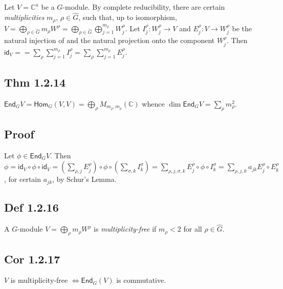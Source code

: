 \documentclass[a4paper]{amsart}
\newcommand{\C}{\mathbb{C}}
\newcommand{\Hom}{\mathsf{Hom}}
\newcommand{\End}{\mathsf{End}}
\newcommand{\id}{\mathsf{id}}
\begin{document}
\subsection{}
Let $V = \C^n$ be a $G$-module.  By complete reducibility, there are
certain \emph{multiplicities} $m_{\rho}$, $\rho \in \hat{G}$, such that, up
to isomorphism, $V = \bigoplus_{\rho \in \hat{G}} m_{\rho} W^{\rho} =
\bigoplus_{\rho \in \hat{G}} \bigoplus_{j = 1}^{m_{\rho}} W^{\rho}_j$.  Let
$I^{\rho}_j \colon W^{\rho}_j \to V$ and $E^{\rho}_j \colon V \to
W^{\rho}_j$ be the natural injection of and the natural projection
onto the component $W^{\rho}_j$.  Then $\id_V = 
= \sum_{\rho} \sum_{j=1}^{m_{\rho}} I^{\rho}_j =
\sum_{\rho} \sum_{j=1}^{m_\rho} E^{\rho}_j$.



\subsection{Thm 1.2.14}
$\End_G V = \Hom_G(V, V) = \bigoplus_{\rho} M_{m_{\rho}, m_{\rho}}(\C)$
whence $\dim \End_G V = \sum_{\rho} m_{\rho}^2$.

\subsection{Proof}
 Let $\phi \in \End_G V$.  Then $\phi
 = \id_V \circ \phi \circ \id_V
 = (\sum_{\rho,j} E^{\rho}_j) \circ \phi \circ (\sum_{\sigma,k} I^{\sigma}_k)
 = \sum_{\rho,j,\sigma,k} E^{\rho}_j \circ \phi \circ I^{\sigma}_k
 = \sum_{\rho,j,k} a_{jk} E^{\rho}_j \circ E^{\rho}_k$, for certain $a_{jk}$, by Schur's Lemma.


\subsection{Def 1.2.16}
A $G$-module $V = \bigoplus_{\rho} m_{\rho} W^{\rho}$ is
\emph{multiplicity-free} if $m_{\rho} < 2$ for all $\rho \in \hat{G}$.

\subsection{Cor 1.2.17}
$V$ is multiplicity-free $\iff \End_G(V)$ is commutative.
\end{document}
